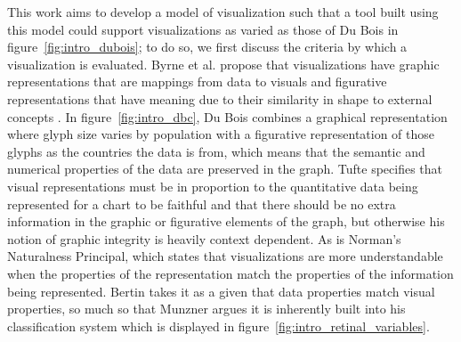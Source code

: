 \documentclass[../main.tex]{subfiles}
\begin{document}
This work aims to develop a model of visualization such that a tool built using this model could support visualizations as varied as those of Du Bois in figure~\ref{fig:intro_dubois}; to do so, we first discuss the criteria by which a visualization is evaluated. Byrne et al. propose that visualizations have graphic representations that are mappings from data to visuals and figurative representations that have meaning due to their similarity in shape to external concepts \cite{byrneAcquiredCodesMeaning2016}. In figure~\ref{fig:intro_dbc}, Du Bois combines a graphical representation where glyph size varies by population with a figurative representation of those glyphs as the countries the data is from, which means that the semantic and numerical properties of the data are preserved in the graph. Tufte specifies that visual representations must be in proportion to the quantitative data being represented for a chart to be faithful and that there should be no extra information in the graphic or figurative elements of the graph, but otherwise his notion of graphic integrity is heavily context dependent\cite{tufteVisualDisplayQuantitative2001}. As is Norman's Naturalness Principal, which states that visualizations are more understandable  when the properties of the representation match the properties of the information being represented\cite{norman_things_smart}. Bertin takes it as a given that data properties match visual properties, so much so that Munzner argues it is inherently built into his classification system \cite{munznerVisualizationAnalysisDesign2014} which is displayed in figure~\ref{fig:intro_retinal_variables}.
\end{document}
